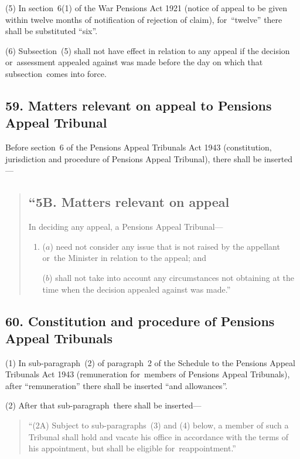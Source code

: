 \documentclass[12pt,a4paper]{article}
\begin{document}
(5) In section~6(1)  of the War Pensions Act 1921 (notice of appeal to be given within twelve months of notification of rejection of claim), for~“twelve” there shall be substituted “six”.

(6) Subsection~(5)  shall not have effect in relation to any appeal if the decision or~assessment appealed against was made before the day on which that subsection~comes into force.

\subsection{59. Matters relevant on appeal to Pensions Appeal Tribunal}

Before section~6 of the Pensions Appeal Tribunals Act 1943 (constitution, jurisdiction and procedure of Pensions Appeal Tribunal), there shall be inserted—
\begin{quotation}
\subsection*{“5B. Matters relevant on appeal}

In deciding any appeal, a Pensions Appeal Tribunal—
\begin{enumerate}\item[]
($a$) need not consider any issue that is not raised by the appellant or~the Minister in relation to the appeal; and

($b$) shall not take into account any circumstances not obtaining at the time when the decision appealed against was made.”
\end{enumerate}
\end{quotation}

\subsection{60. Constitution and procedure of Pensions Appeal Tribunals}

(1) In sub-paragraph~(2)  of paragraph~2 of the Schedule to the Pensions Appeal Tribunals Act 1943 (remuneration for~members of Pensions Appeal Tribunals), after “remuneration” there shall be inserted “and allowances”.

(2) After that sub-paragraph~there shall be inserted—
\begin{quotation}
“(2A) Subject to sub-paragraphs~(3)  and (4)  below, a member of such a Tribunal shall hold and vacate his office in accordance with the terms of his appointment, but shall be eligible for~reappointment.”
\end{quotation}
\end{document}
